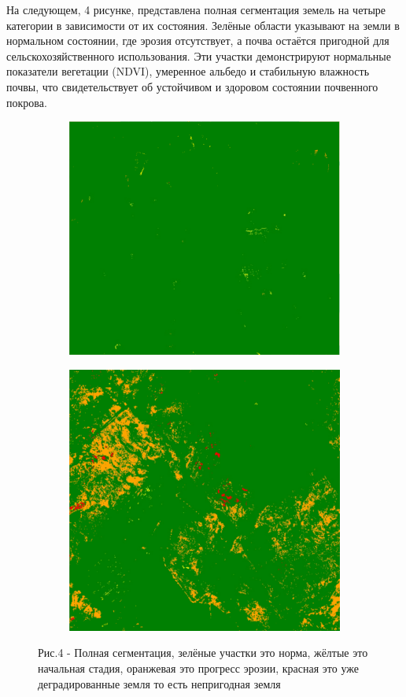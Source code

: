 \begin{multicols}{2}
На следующем, 4 рисунке, представлена полная сегментация земель на
четыре категории в зависимости от их состояния. Зелёные области
указывают на земли в нормальном состоянии, где эрозия отсутствует, а
почва остаётся пригодной для сельскохозяйственного использования. Эти
участки демонстрируют нормальные показатели вегетации (NDVI), умеренное
альбедо и стабильную влажность почвы, что свидетельствует об устойчивом
и здоровом состоянии почвенного покрова.
\end{multicols}

\begin{figure}[H]
   \centering
   \begin{subfigure}{0.45\textwidth}
   	\centering
   	\includegraphics[width=\textwidth, height=0.75\textwidth]{media/ict/image37}
   \end{subfigure}
   \begin{subfigure}{0.45\textwidth}
   	\centering
   	\includegraphics[width=\textwidth, height=0.75\textwidth]{media/ict/image38}
   \end{subfigure}
   \caption*{Рис.4 - Полная сегментация, зелёные участки это норма, жёлтые это начальная стадия, оранжевая это прогресс эрозии, красная это уже деградированные земля то есть непригодная земля}
\end{figure}

